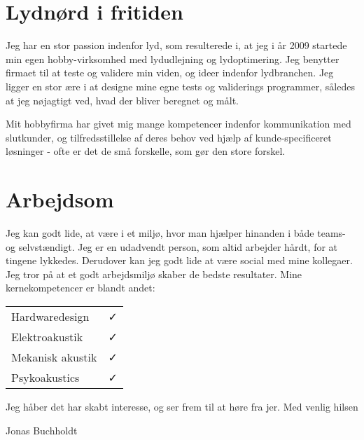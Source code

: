 \documentclass{my_application}
\begin{document}


\section{Lydnørd i fritiden}
Jeg har en stor passion indenfor lyd, som resulterede i, at jeg i år 2009 startede min egen hobby-virksomhed med lydudlejning og lydoptimering. Jeg benytter firmaet til at teste og validere min viden, og ideer indenfor lydbranchen. Jeg ligger en stor ære i at designe mine egne tests og validerings programmer, således at jeg nøjagtigt ved, hvad der bliver beregnet og målt. 

Mit hobbyfirma har givet mig mange kompetencer indenfor kommunikation med slutkunder, og tilfredsstillelse af deres behov ved hjælp af kunde-specificeret løsninger - ofte er det de små forskelle, som gør den store forskel.


\section{Arbejdsom}

Jeg kan godt lide, at være i et miljø, hvor man hjælper hinanden i både teams- og selvstændigt. Jeg er en udadvendt person, som altid arbejder hårdt, for at tingene lykkedes. Derudover kan jeg godt lide at være social med mine kollegaer. Jeg tror på at et godt arbejdsmiljø skaber de bedste resultater. 
\skipline
%
Mine kernekompetencer er blandt andet:
\begin{table}[!ht]
	\begin{tabular}{l c}
		Hardwaredesign & \faCheck \\
		Elektroakustik & \faCheck \\
		Mekanisk akustik & \faCheck\\
		Psykoakustics & \faCheck
	\end{tabular}
\end{table}
%
\skipline
%
Jeg håber det har skabt interesse, og ser frem til at høre fra jer. 
\newline
\newline
Med venlig hilsen

Jonas Buchholdt
\skipline
%	
\end{document}
